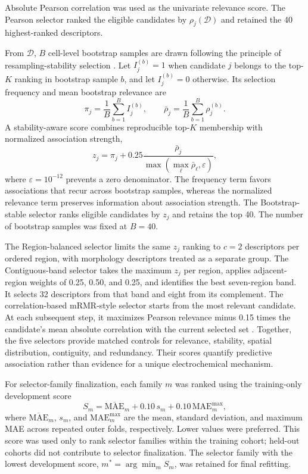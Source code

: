 \documentclass[pdflatex,sn-mathphys-num]{sn-jnl}
\begin{document}
Absolute Pearson correlation was used as the univariate relevance score. The Pearson selector ranked the eligible candidates by $\rho_j(\mathcal{D})$ and retained the 40 highest-ranked descriptors.

From $\mathcal{D}$, $B$ cell-level bootstrap samples are drawn following the principle of resampling-stability selection \cite{meinshausen2010stability}. Let $I_j^{(b)}=1$ when candidate $j$ belongs to the top-$K$ ranking in bootstrap sample $b$, and let $I_j^{(b)}=0$ otherwise. Its selection frequency and mean bootstrap relevance are
\begin{equation}
\pi_j=\frac{1}{B}\sum_{b=1}^{B}I_j^{(b)},
\qquad
\bar{\rho}_j=\frac{1}{B}\sum_{b=1}^{B}\rho_j^{(b)}.
\end{equation}
A stability-aware score combines reproducible top-$K$ membership with normalized association strength,
\begin{equation}
z_j=\pi_j+0.25
\frac{\bar{\rho}_j}
{\max\!\left(\max_{\ell}\bar{\rho}_{\ell},\varepsilon\right)},
\end{equation}
where $\varepsilon=10^{-12}$ prevents a zero denominator. The frequency term favors associations that recur across bootstrap samples, whereas the normalized relevance term preserves information about association strength. The Bootstrap-stable selector ranks eligible candidates by $z_j$ and retains the top 40. The number of bootstrap samples was fixed at $B=40$.

The Region-balanced selector limits the same $z_j$ ranking to $c=2$ descriptors per ordered region, with morphology descriptors treated as a separate group. The Contiguous-band selector takes the maximum $z_j$ per region, applies adjacent-region weights of 0.25, 0.50, and 0.25, and identifies the best seven-region band. It selects 32 descriptors from that band and eight from its complement. The correlation-based mRMR-style selector starts from the most relevant candidate. At each subsequent step, it maximizes Pearson relevance minus 0.15 times the candidate's mean absolute correlation with the current selected set \cite{peng2005feature}. Together, the five selectors provide matched controls for relevance, stability, spatial distribution, contiguity, and redundancy. Their scores quantify predictive association rather than evidence for a unique electrochemical mechanism.

For selector-family finalization, each family $m$ was ranked using the training-only development score
\begin{equation}
S_m=\overline{\mathrm{MAE}}_m+0.10\,s_m+0.10\,\mathrm{MAE}^{\max}_m,
\label{eq:selector_development_score}
\end{equation}
where $\overline{\mathrm{MAE}}_m$, $s_m$, and $\mathrm{MAE}^{\max}_m$ are the mean, standard deviation, and maximum MAE across repeated outer folds, respectively. Lower values were preferred. This score was used only to rank selector families within the training cohort; held-out cohorts did not contribute to selector finalization. The selector family with the lowest development score, $m^{*}=\arg\min_m S_m$, was retained for final refitting.
\end{document}
